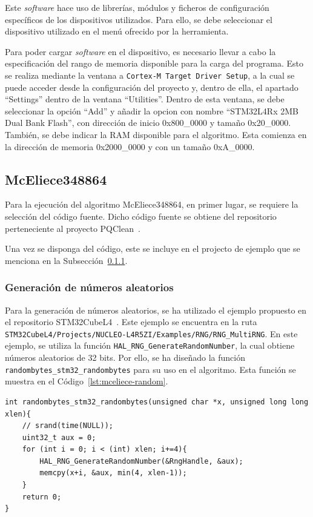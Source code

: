 Este \textit{software} hace uso de librerías, módulos y ficheros de configuración específicos de los dispositivos utilizados.
Para ello, se debe seleccionar el dispositivo utilizado en el menú ofrecido por la herramienta.

Para poder cargar \textit{software} en el dispositivo, es necesario llevar a cabo la especificación del rango de memoria disponible para la carga del programa.
Esto se realiza mediante la ventana a \texttt{Cortex-M Target Driver Setup}, a la cual se puede acceder desde la configuración del proyecto y, dentro de ella, el apartado ``Settings'' dentro de la ventana ``Utilities''.
Dentro de esta ventana, se debe seleccionar la opción ``Add'' y añadir la opcion con nombre ``STM32L4Rx 2MB Dual Bank Flash'', con dirección de inicio 0x800\_0000 y tamaño 0x20\_0000.
También, se debe indicar la RAM disponible para el algoritmo.
Esta comienza en la dirección de memoria 0x2000\_0000 y con un tamaño 0xA\_0000.

\subsection{McEliece348864}\label{subsec:mceliece-stm}

Para la ejecución del algoritmo McEliece348864, en primer lugar, se requiere la selección del código fuente.
Dicho código fuente se obtiene del repositorio perteneciente al proyecto PQClean~\cite{pqclean-github}.

Una vez se disponga del código, este se incluye en el projecto de ejemplo que se menciona en la Subsección~\ref{subsubsec:stm32-random}.


\subsubsection{Generación de números aleatorios}\label{subsubsec:stm32-random}

Para la generación de números aleatorios, se ha utilizado el ejemplo propuesto en el repositorio STM32CubeL4~\cite{stm32cubeL4}.
Este ejemplo se encuentra en la ruta \texttt{STM32CubeL4/Projects/NUCLEO-L4R5ZI/Examples/RNG/RNG\_MultiRNG}.
En este ejemplo, se utiliza la función \texttt{HAL\_RNG\_GenerateRandomNumber}, la cual obtiene números aleatorios de 32 bits.
Por ello, se ha diseñado la función \texttt{randombytes\_stm32\_randombytes} para su uso en el algoritmo.
Esta función se muestra en el Código~\ref{lst:mceliece-random}.

\begin{lstlisting}[label={lst:mceliece-random},style=Cnice,firstnumber=1,caption={Función de generación de números aleatorios para McEliece348864.}]
int randombytes_stm32_randombytes(unsigned char *x, unsigned long long xlen){
    // srand(time(NULL));
    uint32_t aux = 0;
    for (int i = 0; i < (int) xlen; i+=4){
        HAL_RNG_GenerateRandomNumber(&RngHandle, &aux);
        memcpy(x+i, &aux, min(4, xlen-1));
    }
    return 0;
}
\end{lstlisting}

